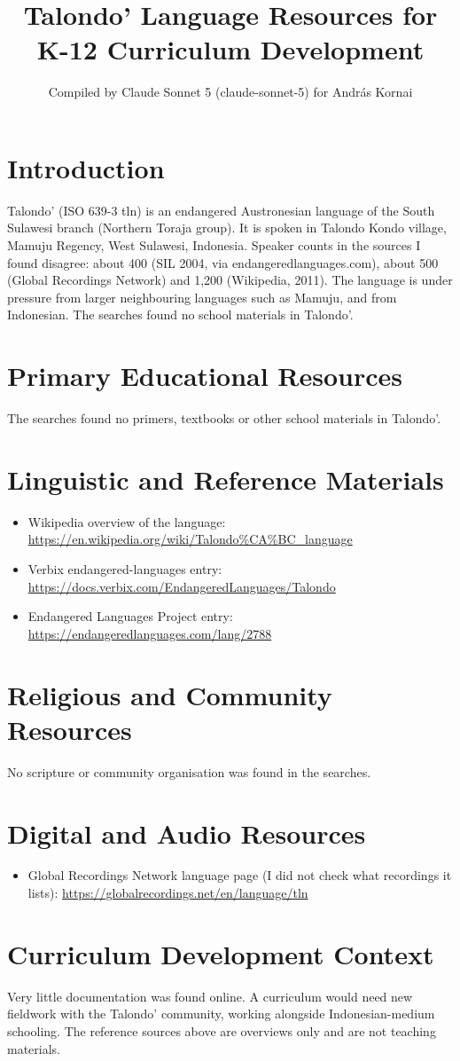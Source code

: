 \documentclass[12pt]{article}
\title{Talondo' Language Resources for K-12 Curriculum Development}
\author{Compiled by Claude Sonnet 5 (claude-sonnet-5) for Andr\'as Kornai}
\date{}
\begin{document}
\maketitle

\section{Introduction}
Talondo' (ISO 639-3 tln) is an endangered Austronesian language of the South Sulawesi branch (Northern Toraja group). It is spoken in Talondo Kondo village, Mamuju Regency, West Sulawesi, Indonesia. Speaker counts in the sources I found disagree: about 400 (SIL 2004, via endangeredlanguages.com), about 500 (Global Recordings Network) and 1,200 (Wikipedia, 2011). The language is under pressure from larger neighbouring languages such as Mamuju, and from Indonesian. The searches found no school materials in Talondo'.

\section{Primary Educational Resources}
The searches found no primers, textbooks or other school materials in Talondo'.

\section{Linguistic and Reference Materials}
\begin{itemize}
\item Wikipedia overview of the language: \url{https://en.wikipedia.org/wiki/Talondo%CA%BC_language}
\item Verbix endangered-languages entry: \url{https://docs.verbix.com/EndangeredLanguages/Talondo}
\item Endangered Languages Project entry: \url{https://endangeredlanguages.com/lang/2788}
\end{itemize}

\section{Religious and Community Resources}
No scripture or community organisation was found in the searches.

\section{Digital and Audio Resources}
\begin{itemize}
\item Global Recordings Network language page (I did not check what recordings it lists): \url{https://globalrecordings.net/en/language/tln}
\end{itemize}

\section{Curriculum Development Context}
Very little documentation was found online. A curriculum would need new fieldwork with the Talondo' community, working alongside Indonesian-medium schooling. The reference sources above are overviews only and are not teaching materials.
\end{document}
